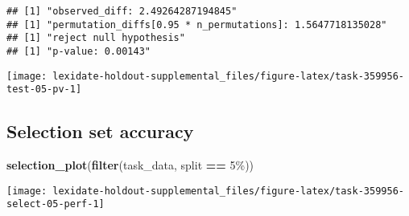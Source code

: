 \documentclass[
]{book}
\newenvironment{Shaded}{\begin{snugshade}}{\end{snugshade}}
\newcommand{\AttributeTok}[1]{\textcolor[rgb]{0.13,0.29,0.53}{#1}}
\newcommand{\DecValTok}[1]{\textcolor[rgb]{0.00,0.00,0.81}{#1}}
\newcommand{\FunctionTok}[1]{\textcolor[rgb]{0.13,0.29,0.53}{\textbf{#1}}}
\newcommand{\NormalTok}[1]{#1}
\newcommand{\OtherTok}[1]{\textcolor[rgb]{0.56,0.35,0.01}{#1}}
\newcommand{\SpecialCharTok}[1]{\textcolor[rgb]{0.81,0.36,0.00}{\textbf{#1}}}
\newcommand{\StringTok}[1]{\textcolor[rgb]{0.31,0.60,0.02}{#1}}
\begin{document}
\begin{Shaded}
\end{Shaded}

\begin{verbatim}
## [1] "observed_diff: 2.49264287194845"
## [1] "permutation_diffs[0.95 * n_permutations]: 1.5647718135028"
## [1] "reject null hypothesis"
## [1] "p-value: 0.00143"
\end{verbatim}

\texttt{[image: lexidate-holdout-supplemental\_files/figure-latex/task-359956-test-05-pv-1]}

\hypertarget{selection-set-accuracy-25}{%
\subsection{Selection set accuracy}\label{selection-set-accuracy-25}}

\begin{Shaded}
\begin{Highlighting}[]
\FunctionTok{selection\_plot}\NormalTok{(}\FunctionTok{filter}\NormalTok{(task\_data, split }\SpecialCharTok{==} \StringTok{\textquotesingle{}5\%\textquotesingle{}}\NormalTok{))}
\end{Highlighting}
\end{Shaded}

\texttt{[image: lexidate-holdout-supplemental\_files/figure-latex/task-359956-select-05-perf-1]}
\end{document}
